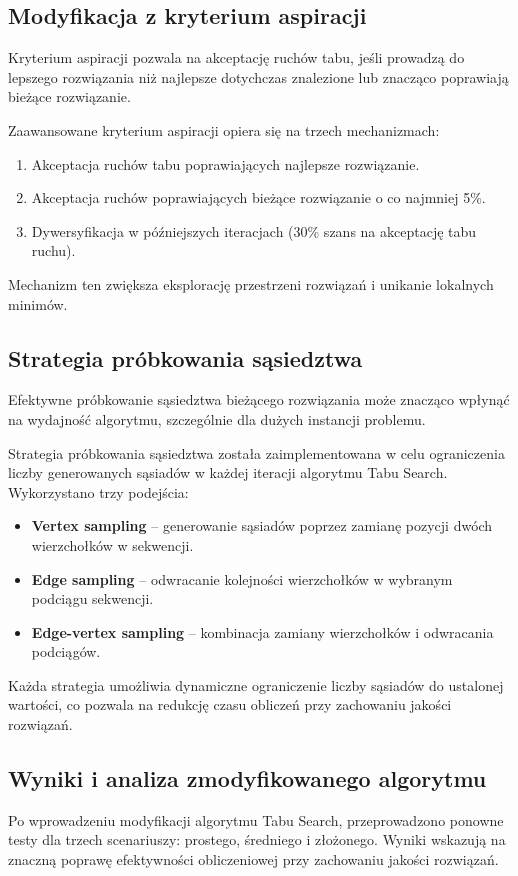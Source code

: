 \documentclass[12pt,a4paper]{article}
\begin{document}
\subsection{Modyfikacja z kryterium aspiracji}
Kryterium aspiracji pozwala na akceptację ruchów tabu, jeśli prowadzą do lepszego rozwiązania niż najlepsze dotychczas znalezione lub znacząco poprawiają bieżące rozwiązanie.

Zaawansowane kryterium aspiracji opiera się na trzech mechanizmach:
\begin{enumerate}
    \item Akceptacja ruchów tabu poprawiających najlepsze rozwiązanie.
    \item Akceptacja ruchów poprawiających bieżące rozwiązanie o co najmniej 5\%.
    \item Dywersyfikacja w późniejszych iteracjach (30\% szans na akceptację tabu ruchu).
\end{enumerate}
Mechanizm ten zwiększa eksplorację przestrzeni rozwiązań i unikanie lokalnych minimów.

\subsection{Strategia próbkowania sąsiedztwa}
Efektywne próbkowanie sąsiedztwa bieżącego rozwiązania może znacząco wpłynąć na wydajność algorytmu, szczególnie dla dużych instancji problemu.

Strategia próbkowania sąsiedztwa została zaimplementowana w celu ograniczenia liczby generowanych sąsiadów w każdej iteracji algorytmu Tabu Search. Wykorzystano trzy podejścia:
\begin{itemize}
    \item \textbf{Vertex sampling} -- generowanie sąsiadów poprzez zamianę pozycji dwóch wierzchołków w sekwencji.
    \item \textbf{Edge sampling} -- odwracanie kolejności wierzchołków w wybranym podciągu sekwencji.
    \item \textbf{Edge-vertex sampling} -- kombinacja zamiany wierzchołków i odwracania podciągów.
\end{itemize}
Każda strategia umożliwia dynamiczne ograniczenie liczby sąsiadów do ustalonej wartości, co pozwala na redukcję czasu obliczeń przy zachowaniu jakości rozwiązań.

\subsection{Wyniki i analiza zmodyfikowanego algorytmu}
Po wprowadzeniu modyfikacji algorytmu Tabu Search, przeprowadzono ponowne testy dla trzech scenariuszy: prostego, średniego i złożonego. Wyniki wskazują na znaczną poprawę efektywności obliczeniowej przy zachowaniu jakości rozwiązań.
\end{document}
